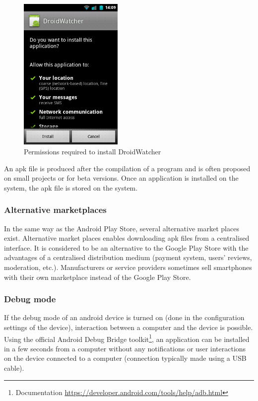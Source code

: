\begin{figure}[h]
  \centering
  \includegraphics[width=5cm]{images/permissions.png}
  \caption{Permissions required to install DroidWatcher}
  \label{fig:perm-dw}
\end{figure}

An apk file is produced after the compilation of a program and is often proposed on small projects or for beta versions.
Once an application is installed on the system, the apk file is stored on the system.

\subsubsection{Alternative marketplaces}

In the same way as the Android Play Store, several alternative market places exist.
Alternative market places enables downloading apk files from a centralised interface.
It is considered to be an alternative to the Google Play Store with the advantages of a centralised distribution medium (payment system, users' reviews, moderation, etc.).
Manufacturers or service providers sometimes sell smartphones with their own marketplace instead of the Google Play Store.\\

\subsubsection{Debug mode}
If the debug mode of an android device is turned on (done in the configuration settings of the device), interaction between a computer and the device is possible.
Using the official Android Debug Bridge toolkit\footnote{Documentation \url{https://developer.android.com/tools/help/adb.html}}, an application can be installed in a few seconds from a computer without any notifications or user interactions on the device connected to a computer (connection typically made using a USB cable).

